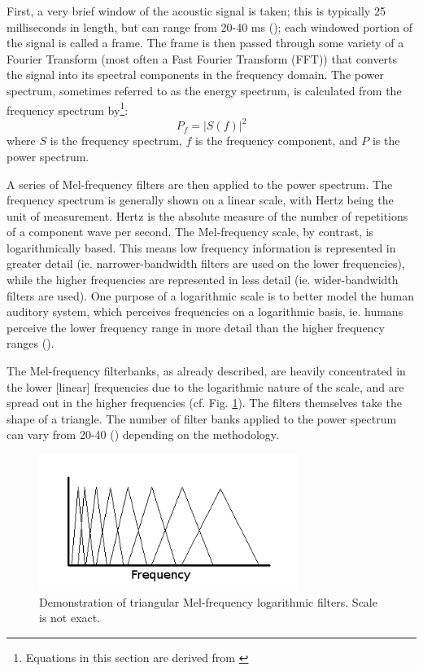 First, a very brief window of the acoustic signal is taken; this is typically 25 milliseconds in length, but can range from 20-40 ms (\cite{vergin:99,molau:01}); each windowed portion of the signal is called a frame.  The frame is then passed through some variety of a Fourier Transform (most often a Fast Fourier Transform (FFT)) that converts the signal into its spectral components in the frequency domain.  The power spectrum, sometimes referred to as the energy spectrum, is calculated from the frequency spectrum by\footnote{Equations in this section are derived from \cite{vergin:99}}: \begin{equation}\label{eq:power-spectrum} P_f = |S(f)|^2 \end{equation} where $S$ is the frequency spectrum, $f$ is the frequency component, and $P$ is the power spectrum.

A series of Mel-frequency filters are then applied to the power spectrum.  The frequency spectrum is generally shown on a linear scale, with Hertz being the unit of measurement.  Hertz is the absolute measure of the number of repetitions of a component wave per second.  The Mel-frequency scale, by contrast, is logarithmically based.  This means low frequency information is represented in greater detail (ie. narrower-bandwidth filters are used on the lower frequencies), while the higher frequencies are represented in less detail (ie. wider-bandwidth filters are used).  One purpose of a logarithmic scale is to better model the human auditory system, which perceives frequencies on a logarithmic basis, ie. humans perceive the lower frequency range in more detail than the higher frequency ranges (\cite{rosen:91}).

The Mel-frequency filterbanks, as already described, are heavily concentrated in the lower [linear] frequencies due to the logarithmic nature of the scale, and are spread out in the higher frequencies (cf. Fig. \ref{fig:filt-mfcc}). The filters themselves take the shape of a triangle.  The number of filter banks applied to the power spectrum can vary from 20-40 (\cite{honig:05,gold:11}) depending on the methodology. 

\begin{figure}[h]
\centering
\includegraphics[width=0.75\textwidth]{figure/filt-mfcc.png}
\caption{Demonstration of triangular Mel-frequency logarithmic filters. Scale is not exact.}\label{fig:filt-mfcc}
\end{figure}

